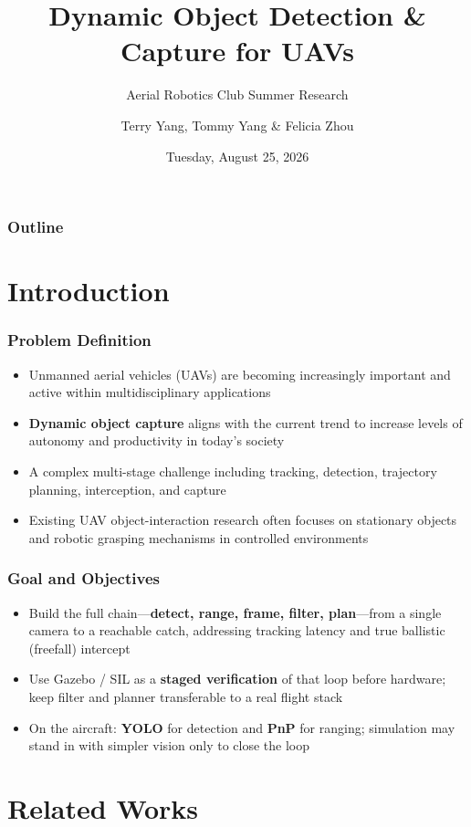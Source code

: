 \documentclass{beamer}
\title[Dynamic Object Capture]
{Dynamic Object Detection \& Capture for UAVs}
\subtitle{Aerial Robotics Club Summer Research}
\author[Terry Yang, Tommy Yang \& Felicia Zhou]
{Terry Yang, Tommy Yang \& Felicia Zhou}
\institute[UTIAS]
{
  University of Toronto Institute for Aerospace Studies \\
  Aerial Robotics Club Summer Research Program
}
\date[Wednesday, August 20, 2025]
{Tuesday, August 25, 2026}
\begin{document}
\frame{\titlepage}

\begin{frame}
\frametitle{Outline}
\tableofcontents
\end{frame}

\section{Introduction}

\begin{frame}
\frametitle{Problem Definition}
\begin{itemize}
    \item Unmanned aerial vehicles (UAVs) are becoming increasingly important and active within multidisciplinary applications
    \item \textbf{Dynamic object capture} aligns with the current trend to increase levels of autonomy and productivity in today’s society
    \item A complex multi-stage challenge including tracking, detection, trajectory planning, interception, and capture
    \item Existing UAV object-interaction research often focuses on stationary objects and robotic grasping mechanisms in controlled environments
\end{itemize}
\end{frame}

\begin{frame}
\frametitle{Goal and Objectives}
\begin{itemize}
    \item Build the full chain---\textbf{detect, range, frame, filter, plan}---from a single camera to a reachable catch, addressing tracking latency and true ballistic (freefall) intercept
    \item Use Gazebo / SIL as a \textbf{staged verification} of that loop before hardware; keep filter and planner transferable to a real flight stack
    \item On the aircraft: \textbf{YOLO} for detection and \textbf{PnP} for ranging; simulation may stand in with simpler vision only to close the loop
\end{itemize}
\end{frame}

\section{Related Works}
\end{document}
